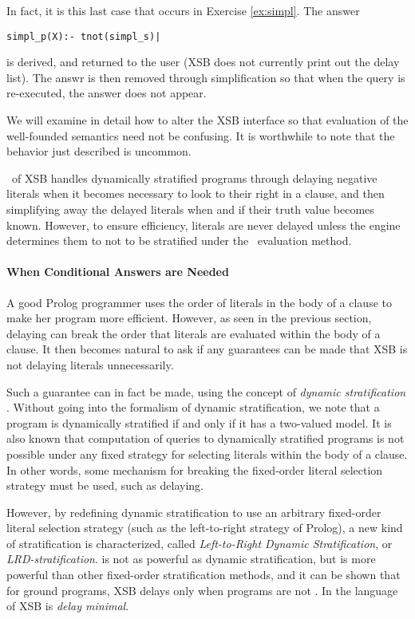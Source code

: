 In fact, it is this last case that occurs in Exercise \ref{ex:simpl}.
The answer
\begin{verbatim}
simpl_p(X):- tnot(simpl_s)|
\end{verbatim}
is derived, and returned to the user (XSB does not currently print out
the delay list).  The answr is then removed through simplification so
that when the query is re-executed, the answer does not appear.

We will examine in detail how to alter the XSB interface so that
evaluation of the well-founded semantics need not be confusing.  It is
worthwhile to note that the behavior just described is uncommon.

\version\ of XSB handles dynamically stratified programs through
delaying negative literals when it becomes necessary to look to their
right in a clause, and then simplifying away the delayed literals when
and if their truth value becomes known.  However, to ensure
efficiency, literals are never delayed unless the engine determines
them to not to be stratified under the \LRD\ evaluation method.

\paragraph{When Conditional Answers are Needed} \label{sec:lrd}

A good Prolog programmer uses the order of literals in the body of a
clause to make her program more efficient.  However, as seen in the
previous section, delaying can break the order that literals are
evaluated within the body of a clause.  It then becomes natural to ask
if any guarantees can be made that XSB is not delaying literals
unnecessarily.

Such a guarantee can in fact be made, using the concept of {\em
dynamic stratification} \cite{Przy89d}.  Without going into the
formalism of dynamic stratification, we note that a program is
dynamically stratified if and only if it has a two-valued model.  It
is also known that computation of queries to dynamically
stratified programs is not possible under any fixed strategy for
selecting literals within the body of a clause.  In other words, some
mechanism for breaking the fixed-order literal selection strategy must
be used, such as delaying.

However, by redefining dynamic stratification to use an arbitrary
fixed-order literal selection strategy (such as the left-to-right
strategy of Prolog), a new kind of stratification is characterized,
called {\em Left-to-Right Dynamic Stratification}, or {\em
LRD-stratification}.  \LRD{} is not as powerful as dynamic
stratification, but is more powerful than other fixed-order
stratification methods, and it can be shown that for ground programs,
XSB delays only when programs are not \LRD.  In the language of
\cite{SaSW99} XSB is {\em delay minimal}.


